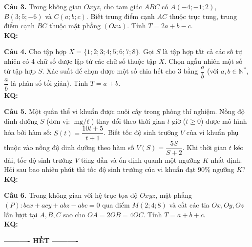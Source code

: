 \documentclass[12pt,a4paper]{article}
\begin{document}
\vspace{0.15cm}
\textbf{Câu 3.} Trong không gian $Oxyz$, cho tam giác $ABC$ có $A(-4; -1; 2)$, $B(3; 5; -6)$ và $C(a; b; c)$. Biết trung điểm cạnh $AC$ thuộc trục tung, trung điểm cạnh $BC$ thuộc mặt phẳng $(Oxz)$. Tính $T = 2a + b - c$.\\
\textbf{KQ:} \fbox{\phantom{\rule{2.5cm}{0.5cm}}}

\newpage
\textbf{Câu 4.} Cho tập hợp $X = \{1; 2; 3; 4; 5; 6; 7; 8\}$. Gọi $S$ là tập hợp tất cả các số tự nhiên có 4 chữ số được lập từ các chữ số thuộc tập $X$. Chọn ngẫu nhiên một số từ tập hợp $S$. Xác suất để chọn được một số chia hết cho 3 bằng $\dfrac{a}{b}$ (với $a, b \in \mathbb{N}^*$, $\dfrac{a}{b}$ là phân số tối giản). Tính $T = a + b$.\\
\textbf{KQ:} \fbox{\phantom{\rule{2.5cm}{0.5cm}}}

\vspace{0.25cm}
\textbf{Câu 5.} Một quần thể vi khuẩn được nuôi cấy trong phòng thí nghiệm. Nồng độ dinh dưỡng $S$ (đơn vị: $\text{mg/}\ell$) thay đổi theo thời gian $t$ giờ ($t \geqslant 0$) được mô hình hóa bởi hàm số: $S(t) = \dfrac{10t + 5}{t + 1}$. Biết tốc độ sinh trưởng $V$ của vi khuẩn phụ thuộc vào nồng độ dinh dưỡng theo hàm số $V(S) = \dfrac{5S}{S + 2}$. Khi thời gian $t$ kéo dài, tốc độ sinh trưởng $V$ tăng dần và ổn định quanh một ngưỡng $K$ nhất định. Hỏi sau bao nhiêu phút thì tốc độ sinh trưởng của vi khuẩn đạt $90\%$ ngưỡng $K$?\\
\textbf{KQ:} \fbox{\phantom{\rule{2.5cm}{0.5cm}}}

\vspace{0.25cm}
\textbf{Câu 6.} Trong không gian với hệ trục tọa độ $Oxyz$, mặt phẳng $(P)\colon bcx + acy + abz - abc = 0$ qua điểm $M(2; 4; 8)$ và cắt các tia $Ox, Oy, Oz$ lần lượt tại $A, B, C$ sao cho $OA = 2OB = 4OC$. Tính $T = a + b + c$.\\
\textbf{KQ:} \fbox{\phantom{\rule{2.5cm}{0.5cm}}}

\vspace{0.6cm}
\begin{center}
\textbf{---------- HẾT ----------}
\end{center}
\end{document}
